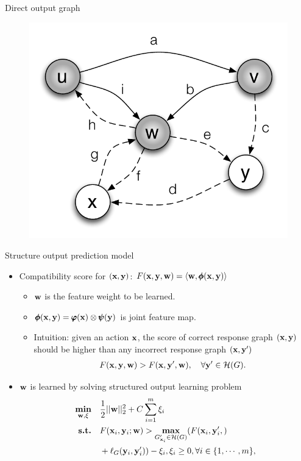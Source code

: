 \documentclass[first=dgreen,second=purple,logo=yellowexc]{aaltoslides}
\begin{document}
\begin{frame}{Direct output graph}
\begin{multicols}{2}
\begin{figure}
		\includegraphics[scale=0.25]{./figures/propagation_example.pdf}
	\end{figure}
	\end{multicols}
\end{frame}

\begin{frame}{Structure output prediction model}
	\begin{itemize}
		\item Compatibility score for $(\mathbf {x},\mathbf {y})$: $F(\mathbf {x},\mathbf {y},\mathbf {w}) = \langle \mathbf {w}, \pmb \phi(\mathbf {x},\mathbf {y}) \rangle$
			\begin{itemize}\footnotesize
				\item $\mathbf {w}$ is the feature weight to be learned.
				\item $\pmb \phi(\mathbf {x},\mathbf {y})=\pmb \varphi(\mathbf {x})\otimes\pmb \psi(\mathbf {y})$ is joint feature map.
				\item Intuition: given an action $\mathbf {x}$, the score of correct response graph $(\mathbf {x},\mathbf {y})$ should be higher than any incorrect response graph $(\mathbf {x},\mathbf {y}')$
				\begin{align*}
					F(\mathbf {x},\mathbf {y},\mathbf {w})>F(\mathbf {x},\mathbf {y}',\mathbf {w}), \quad \forall \mathbf {y}'\in\mathcal{H}(G).
				\end{align*}
			\end{itemize}
		\item $\mathbf {w}$ is learned by solving structured output learning problem
		\begin{align*}
			\underset{\mathbf {w},\xi}{\textbf{min}} &\quad \frac{1}{2}||\mathbf {w}||^2_2+C\sum_{i=1}^{m}\xi_i \\
			\textbf{s.t.} &\quad F(\mathbf {x}_i,\mathbf {y}_i;\mathbf {w}) > \underset{G_{\mathbf {x}_i}'\in\mathcal{H}(G)}{\textbf{max}} (F(\mathbf {x}_i,\mathbf {y}_i', )\\
			&\quad +\ell_G(\mathbf {y}_i,\mathbf {y}_i'))-\xi_i, \xi_i\ge 0,\forall i\in\{1,\cdots,m\},
		\end{align*}
	\end{itemize}
\end{frame}
\end{document}
